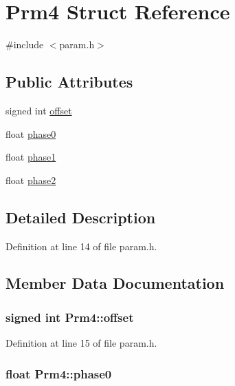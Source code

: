 \hypertarget{structPrm4}{
\section{Prm4 Struct Reference}
\label{structPrm4}
}


{\ttfamily \#include $<$param.h$>$}\subsection*{Public Attributes}
\begin{DoxyCompactItemize}
\item 
signed int \hyperlink{structPrm4_a050c3f385134400342a7d5bb8626f94a}{offset}
\item 
float \hyperlink{structPrm4_a138d97c7f901f0fb0de083e888ab8aa7}{phase0}
\item 
float \hyperlink{structPrm4_a9d2a99a83026538f913750076b481d42}{phase1}
\item 
float \hyperlink{structPrm4_a2ebf28123921c775e194b713a6553aa8}{phase2}
\end{DoxyCompactItemize}


\subsection{Detailed Description}


Definition at line 14 of file param.h.

\subsection{Member Data Documentation}
\hypertarget{structPrm4_a050c3f385134400342a7d5bb8626f94a}{
\subsubsection[{offset}]{\setlength{\rightskip}{0pt plus 5cm}signed int {\bf Prm4::offset}}}
\label{structPrm4_a050c3f385134400342a7d5bb8626f94a}


Definition at line 15 of file param.h.\hypertarget{structPrm4_a138d97c7f901f0fb0de083e888ab8aa7}{
\subsubsection[{phase0}]{\setlength{\rightskip}{0pt plus 5cm}float {\bf Prm4::phase0}}}
\label{structPrm4_a138d97c7f901f0fb0de083e888ab8aa7}



